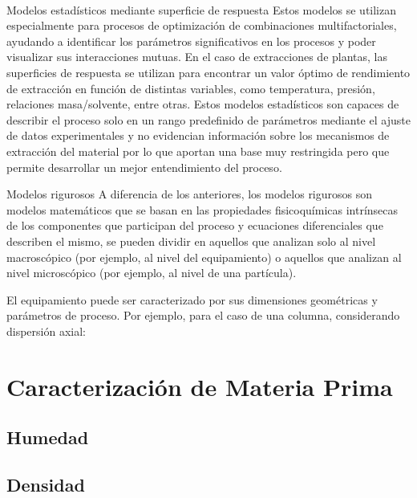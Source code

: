 \documentclass[11pt,a4paper]{article}
\begin{document}
\paragraph{}
\begin{descriptionB}
\item[Modelos estadísticos mediante superficie de respuesta]
Estos modelos se utilizan especialmente para procesos de optimización de combinaciones multifactoriales, ayudando a identificar los parámetros significativos en los procesos y poder visualizar sus interacciones mutuas. En el caso de extracciones de plantas, las superficies de respuesta se utilizan para encontrar un valor óptimo de rendimiento de extracción en función de distintas variables, como temperatura, presión, relaciones masa/solvente, entre otras. Estos modelos estadísticos son capaces de describir el proceso solo en un rango predefinido de parámetros mediante el ajuste de datos experimentales y no evidencian información sobre los mecanismos de extracción del material por lo que aportan una base muy restringida pero que permite desarrollar un mejor entendimiento del proceso.

\item[Modelos rigurosos]
A diferencia de los anteriores, los modelos rigurosos son modelos matemáticos que se basan en las propiedades fisicoquímicas intrínsecas de los componentes que participan del proceso y ecuaciones diferenciales que describen el mismo, se pueden dividir en aquellos que analizan solo al nivel macroscópico (por ejemplo, al nivel del equipamiento) o aquellos que analizan al nivel microscópico (por ejemplo, al nivel de una partícula).

El equipamiento puede ser caracterizado por sus dimensiones geométricas y parámetros de proceso. Por ejemplo, para el caso de una columna, considerando dispersión axial:



\end{descriptionB}

\section{Caracterización de Materia Prima}
\subsection{Humedad\label{humedad}}
\subsection{Densidad\label{densidad}}
\end{document}
